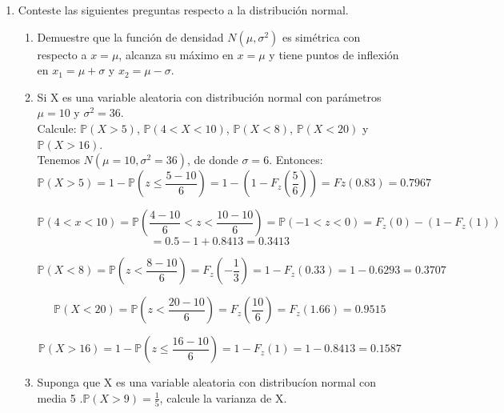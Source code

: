 \documentclass[11pt,a4paper]{report}
\begin{document}
\begin{enumerate}
{            
		}

		\item{
			Conteste las siguientes preguntas respecto a la distribución normal.
			\begin{enumerate}
				\item {
					Demuestre que la función de densidad $N(\mu, \sigma^2)$ es
                    simétrica con respecto a $x = \mu$, alcanza su máximo en
                    $x = \mu$ y tiene puntos de inflexión en $x_1= \mu + \sigma$
                    y $x_2 = \mu - \sigma$.\\
				}

				\item {
					Si X es una variable aleatoria con distribución normal con
                    parámetros $\mu = 10$ y $\sigma^2 = 36$.\\
                    Calcule: $\mathbb{P}(X > 5)$, $\mathbb{P}(4 < X < 10)$,
                    $\mathbb{P}(X < 8)$, $\mathbb{P}(X < 20)$ y
                    $\mathbb{P}(X > 16)$.\\
                    
                    Tenemos  $N(\mu = 10, \sigma^2 = 36)$, de donde $\sigma = 6$.
                    Entonces:
                    \[ \mathbb{P}(X > 5) = 1 - \mathbb{P}(z \leq \frac{5-10}{6}) =1 - (1 -  F_z(\frac{5}{6})) =  Fz(0.83) = 0.7967 \]
                    
                    \[ \mathbb{P}(4 < x < 10) = \mathbb{P}(\frac{4-10}{6} < z < \frac{10-10}{6}) =\mathbb{P}(-1 < z < 0) =  F_z(0) - (1 - F_z(1))\]
                    \[= 0.5 - 1 + 0.8413 = 0.3413 \]
                    
                    \[ \mathbb{P}(X < 8) = \mathbb{P}(z < \frac{8-10}{6}) = F_z(-\frac{1}{3}) = 1 - F_z(0.33) = 1 - 0.6293 = 0.3707 \]
                    
                     \[ \mathbb{P}(X < 20) = \mathbb{P}(z < \frac{20-10}{6}) = F_z(\frac{10}{6}) = F_z(1.66) = 0.9515 \]
                     
                     \[ \mathbb{P}(X > 16) = 1 - \mathbb{P}(z \leq \frac{16-10}{6}) = 1 -  F_z(1) =  1 - 0.8413 = 0.1587 \]
				}

				\item {
				Suponga que X es una variable aleatoria con distribucíon normal con media 5 .$\mathbb{P} (X > 9) = \frac{1}{5}$, calcule la varianza de X.\\
				
}
\end{enumerate}}
\end{enumerate}
\end{document}
